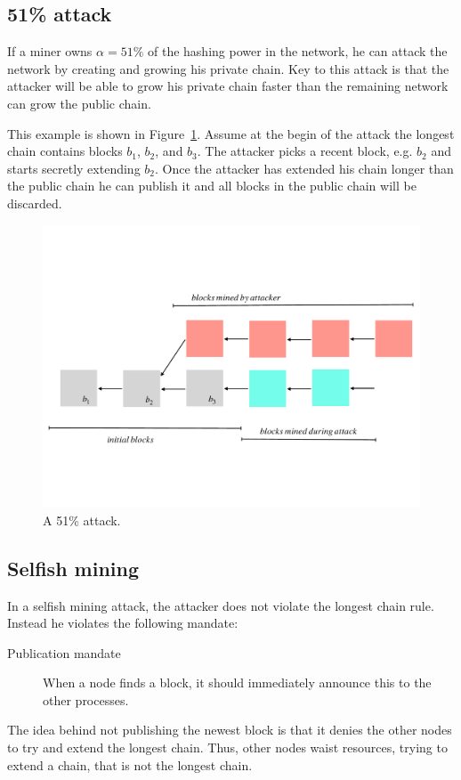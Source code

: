 \subsection{51\% attack}
If a miner owns $\alpha=51\%$ of the hashing power in the network, he can attack the network by creating and growing his private chain.
Key to this attack is that the attacker will be able to grow his private chain faster than the remaining network can grow the public chain.

\begin{example}
This example is shown in Figure~\ref{fig:51}. 
Assume at the begin of the attack the longest chain contains blocks $b_1$, $b_2$, and $b_3$. The attacker picks a recent block, e.g. $b_2$ and starts secretly extending $b_2$. Once the attacker has extended his chain longer than the public chain he can publish it and all blocks in the public chain will be discarded.
\end{example}

\begin{figure}
	\includegraphics[width=\textwidth]{fig/51attack}
	\caption{A 51\% attack.}
	\label{fig:51}
\end{figure}

\subsection{Selfish mining}
In a selfish mining attack, the attacker does not violate the longest chain rule. Instead he violates the following mandate:
\begin{description}
	\item[Publication mandate] When a node finds a block, it should immediately announce this to the other processes. 
\end{description}
The idea behind not publishing the newest block is that it denies the other nodes to try and extend the longest chain. Thus, other nodes waist resources, trying to extend a chain, that is not the longest chain.


